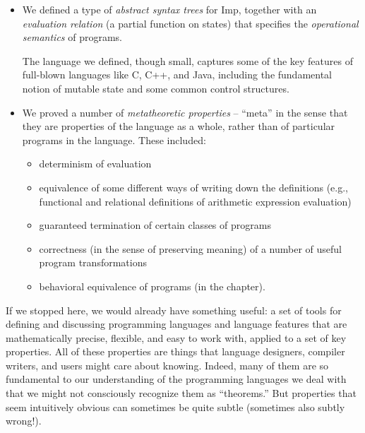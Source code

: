 \documentclass[12pt]{report}
\begin{document}
\begin{itemize}
\item  We defined a type of \textit{abstract syntax trees} for Imp, together
      with an \textit{evaluation relation} (a partial function on states)
      that specifies the \textit{operational semantics} of programs.


      The language we defined, though small, captures some of the key
      features of full-blown languages like C, C++, and Java,
      including the fundamental notion of mutable state and some
      common control structures.



\item  We proved a number of \textit{metatheoretic properties} -- ``meta'' in
      the sense that they are properties of the language as a whole,
      rather than of particular programs in the language.  These
      included:



\begin{itemize}
\item  determinism of evaluation



\item  equivalence of some different ways of writing down the
          definitions (e.g., functional and relational definitions of
          arithmetic expression evaluation)



\item  guaranteed termination of certain classes of programs



\item  correctness (in the sense of preserving meaning) of a number
          of useful program transformations



\item  behavioral equivalence of programs (in the 
          chapter). 
\end{itemize}

\end{itemize}


 If we stopped here, we would already have something useful: a set
    of tools for defining and discussing programming languages and
    language features that are mathematically precise, flexible, and
    easy to work with, applied to a set of key properties.  All of
    these properties are things that language designers, compiler
    writers, and users might care about knowing.  Indeed, many of them
    are so fundamental to our understanding of the programming
    languages we deal with that we might not consciously recognize
    them as ``theorems.''  But properties that seem intuitively obvious
    can sometimes be quite subtle (sometimes also subtly wrong!).
\end{document}

